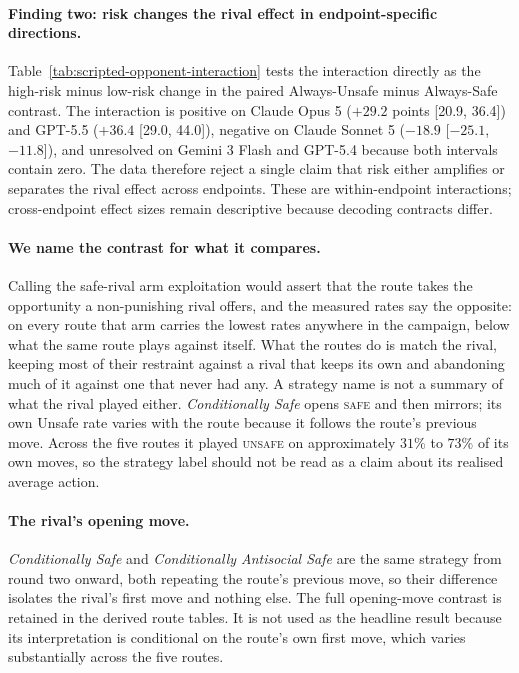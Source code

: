 \documentclass[sigconf,anonymous]{aamas}
\newcommand{\Safe}{\textsc{safe}}
\newcommand{\Unsafe}{\textsc{unsafe}}
\begin{document}
\paragraph{Finding two: risk changes the rival effect in endpoint-specific
directions.} Table~\ref{tab:scripted-opponent-interaction} tests the interaction
directly as the high-risk minus low-risk change in the paired Always-Unsafe
minus Always-Safe contrast. The interaction is positive on Claude Opus 5
($+29.2$ points [20.9, 36.4]) and GPT-5.5 ($+36.4$ [29.0, 44.0]), negative on
Claude Sonnet 5 ($-18.9$ [$-25.1$, $-11.8$]), and unresolved on Gemini 3 Flash
and GPT-5.4 because both intervals contain zero. The data therefore reject a
single claim that risk either amplifies or separates the rival effect across
endpoints. These are within-endpoint interactions; cross-endpoint effect sizes
remain descriptive because decoding contracts differ.

\paragraph{We name the contrast for what it compares.} Calling the safe-rival
arm exploitation would assert that the route takes the opportunity a
non-punishing rival offers, and the measured rates say the opposite: on every
route that arm carries the lowest rates anywhere in the campaign, below what the
same route plays against itself. What the routes do is match the rival, keeping
most of their restraint against a rival that keeps its own and abandoning much
of it against one that never had any. A strategy name is not a summary of what
the rival played either. \emph{Conditionally Safe} opens \Safe{} and then mirrors;
its own Unsafe rate varies with the route because it follows the route's
previous move. Across the five routes it played \Unsafe{} on approximately
$31\%$ to $73\%$ of its own moves, so the strategy label should not be read as
a claim about its realised average action.

\paragraph{The rival's opening move.} \emph{Conditionally Safe} and
\emph{Conditionally Antisocial Safe} are the same strategy from round two onward, both
repeating the route's previous move, so their difference isolates the rival's
first move and nothing else. The full opening-move contrast is retained in the
derived route tables. It is not used as the headline result because its
interpretation is conditional on the route's own first move, which varies
substantially across the five routes.
\end{document}
